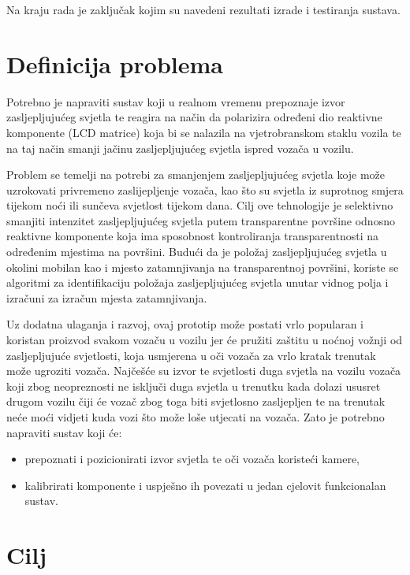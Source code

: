 \documentclass{foi}
\begin{document}
Na kraju rada je zaključak kojim su navedeni rezultati izrade i testiranja sustava.

\section{Definicija problema}

 Potrebno je napraviti sustav koji u realnom vremenu prepoznaje izvor zasljepljujućeg svjetla te reagira na način da polarizira određeni dio reaktivne komponente (LCD matrice) koja bi se nalazila na vjetrobranskom staklu vozila te na taj način smanji jačinu zasljepljujućeg svjetla ispred vozača u vozilu.

 Problem se temelji na potrebi za smanjenjem zasljepljujućeg svjetla koje može uzrokovati privremeno zaslijepljenje vozača, kao što su svjetla iz suprotnog smjera tijekom noći ili sunčeva svjetlost tijekom dana. Cilj ove tehnologije je selektivno smanjiti intenzitet zasljepljujućeg svjetla putem transparentne površine odnosno reaktivne komponente koja ima sposobnost kontroliranja transparentnosti na određenim mjestima na površini. Budući da je položaj zasljepljujućeg svjetla u okolini mobilan kao i mjesto zatamnjivanja na transparentnoj površini, koriste se algoritmi za identifikaciju položaja zasljepljujućeg svjetla unutar vidnog polja i izračuni za izračun mjesta zatamnjivanja.

Uz dodatna ulaganja i razvoj, ovaj prototip može postati vrlo popularan i koristan proizvod svakom vozaču u vozilu jer će pružiti zaštitu u noćnoj vožnji od zasljepljujuće svjetlosti, koja usmjerena u oči vozača za vrlo kratak trenutak može ugroziti vozača. Najčešće su izvor te svjetlosti duga svjetla na vozilu vozača koji zbog neopreznosti ne isključi duga svjetla u trenutku kada dolazi ususret drugom vozilu čiji će vozač zbog toga biti svjetlosno zasljepljen te na trenutak neće moći vidjeti kuda vozi što može loše utjecati na vozača. Zato je potrebno napraviti sustav koji će:
\begin{itemize}[noitemsep]
    \item prepoznati i pozicionirati izvor svjetla te oči vozača koristeći kamere,
    \item kalibrirati komponente i uspješno ih povezati u jedan cjelovit funkcionalan sustav.
\end{itemize}

\section{Cilj}
\end{document}
